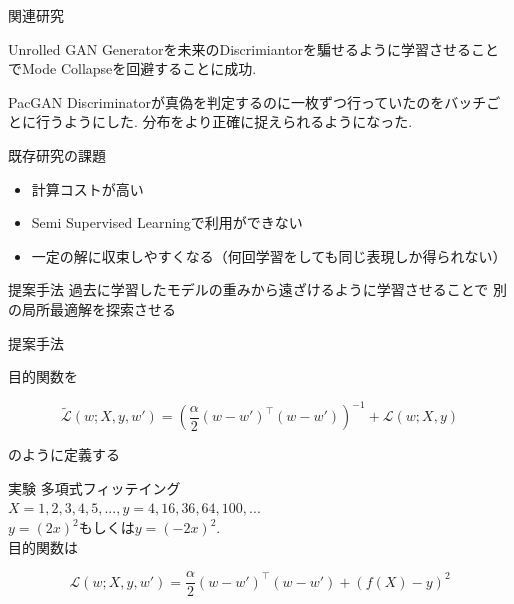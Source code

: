 \documentclass[dvipdfmx,12pt,unicode]{beamer}
\begin{document}
\begin{frame}{関連研究}

  \begin{block}{Unrolled GAN\cite{unrolled}}
    Generatorを未来のDiscrimiantorを騙せるように学習させることでMode Collapseを回避することに成功.
  \end{block}

  \begin{block}{PacGAN\cite{pacgan}}
    Discriminatorが真偽を判定するのに一枚ずつ行っていたのをバッチごとに行うようにした. 分布をより正確に捉えられるようになった.
  \end{block}
\end{frame}

\begin{frame}{既存研究の課題}
  \begin{itemize}
  \item 計算コストが高い
  \item Semi Supervised Learningで利用ができない
  \item 一定の解に収束しやすくなる（何回学習をしても同じ表現しか得られない）
  \end{itemize}
\end{frame}

\begin{frame}{提案手法}
  過去に学習したモデルの重みから遠ざけるように学習させることで
  別の局所最適解を探索させる
\end{frame}

\begin{frame}{提案手法}

目的関数を

\begin{equation}
  \label{unshare}
  \tilde{\mathcal{L}}(w; X, y, w') =  (\frac{\alpha}{2} (w - w')^{\top}(w - w'))^{-1} + \mathcal{L}(w; X, y)  
\end{equation}


のように定義する
  
\end{frame}

\begin{frame}{実験}
  多項式フィッテイング \\
  $X = {1, 2, 3, 4, 5,...}, y = {4, 16, 36, 64, 100,..}$. \\
  $y = (2x)^{2}$もしくは$y = (-2x)^{2}$. \\
  目的関数は
  
  \begin{equation}
    \label{regression}
    \mathcal{L}(w; X, y, w') =  \frac{\alpha}{2} (w - w')^{\top}(w - w') + (f(X) - y)^{2} 
  \end{equation}      
\end{frame}
\end{document}
